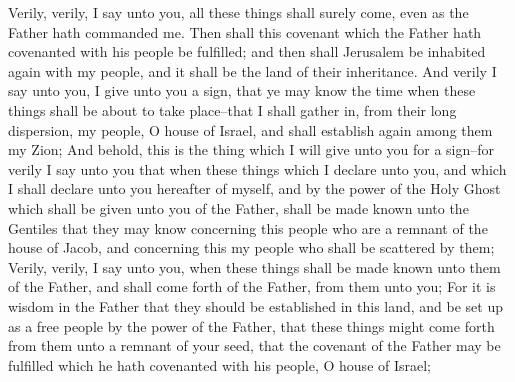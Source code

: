 Verily, verily, I say unto you, all these things shall surely come, even as the Father hath commanded me. Then shall this covenant which the Father hath covenanted with his people be fulfilled; and then shall Jerusalem be inhabited again with my people, and it shall be the land of their inheritance.
\bchapter
\bverse \iffalse And verily I say unto you, I give unto you a sign, that ye may know the time when these things shall be about to take place--that I shall gather in, from their long dispersion, my people, O house of Israel, and shall establish again among them my Zion; \fi
And verily I say unto you, I give unto you a sign, that ye may know the time when these things shall be about to take place--that I shall gather in, from their long dispersion, my people, O house of Israel, and shall establish again among them my Zion;
\bverse \iffalse And behold, this is the thing which I will give unto you for a sign--for verily I say unto you that when these things which I declare unto you, and which I shall declare unto you hereafter of myself, and by the power of the Holy Ghost which shall be given unto you of the Father, shall be made known unto the Gentiles that they may know concerning this people who are a remnant of the house of Jacob, and concerning this my people who shall be scattered by them; \fi
And behold, this is the thing which I will give unto you for a sign--for verily I say unto you that when these things which I declare unto you, and which I shall declare unto you hereafter of myself, and by the power of the Holy Ghost which shall be given unto you of the Father, shall be made known unto the Gentiles that they may know concerning this people who are a remnant of the house of Jacob, and concerning this my people who shall be scattered by them;
\bverse \iffalse Verily, verily, I say unto you, when these things shall be made known unto them of the Father, and shall come forth of the Father, from them unto you; \fi
Verily, verily, I say unto you, when these things shall be made known unto them of the Father, and shall come forth of the Father, from them unto you;
\bverse \iffalse For it is wisdom in the Father that they should be established in this land, and be set up as a free people by the power of the Father, that these things might come forth from them unto a remnant of your seed, that the covenant of the Father may be fulfilled which he hath covenanted with his people, O house of Israel; \fi
For it is wisdom in the Father that they should be established in this land, and be set up as a free people by the power of the Father, that these things might come forth from them unto a remnant of your seed, that the covenant of the Father may be fulfilled which he hath covenanted with his people, O house of Israel;
